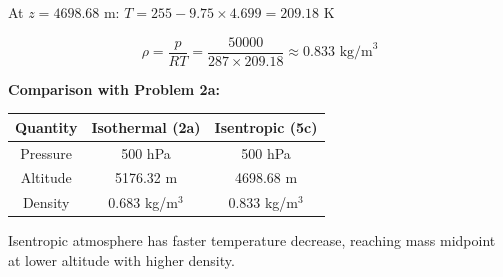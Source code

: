 \documentclass[letterpaper, 11pt]{article}
\newcommand{\1}{\mathds{1}}	%
\theoremstyle{definition}
\begin{document}
At $z = 4698.68$ m: $T = 255 - 9.75 \times 4.699 = 209.18$ K

\begin{equation*}
\rho = \frac{p}{RT} = \frac{50000}{287 \times 209.18} \approx 0.833 \text{ kg/m}^3
\end{equation*}

\textbf{Comparison with Problem 2a:}

\begin{center}
\begin{tabular}{|c|c|c|}
\hline
Quantity & Isothermal (2a) & Isentropic (5c) \\
\hline
Pressure & 500 hPa & 500 hPa \\
Altitude & 5176.32 m & 4698.68 m \\
Density & 0.683 kg/m$^3$ & 0.833 kg/m$^3$ \\
\hline
\end{tabular}
\end{center}

Isentropic atmosphere has faster temperature decrease, reaching mass midpoint at lower altitude with higher density.
\end{document}
